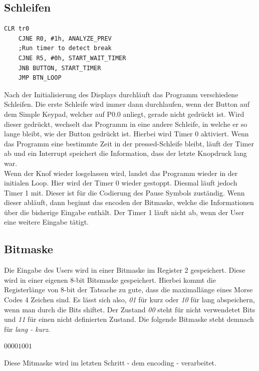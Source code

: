 \documentclass[a4paper,12pt]{article}
\begin{document}
	\subsection{Schleifen}
		\begin{lstlisting}[caption={Dauerschleife während Knopf nicht gedrückt ist},captionpos=b]
	CLR tr0
	CJNE R0, #1h, ANALYZE_PREV
	;Run timer to detect break
	CJNE R5, #0h, START_WAIT_TIMER
	JNB BUTTON, START_TIMER
	JMP BTN_LOOP
		\end{lstlisting}
	Nach der Initialisierung des Displays durchläuft das Programm verschiedene Schleifen. Die erste Schleife wird immer dann durchlaufen, wenn der Button auf dem Simple Keypad, welcher auf P0.0 anliegt, gerade nicht gedrückt ist. Wird dieser gedrückt, wechselt das Programm in eine andere Schleife, in welche er so lange bleibt, wie der Button gedrückt ist. Hierbei wird Timer 0 aktiviert. Wenn das Programm eine bestimmte Zeit in der pressed-Schleife bleibt, läuft der Timer ab und ein Interrupt speichert die Information, dass der letzte Knopdruck lang war.\\
	Wenn der Knof wieder losgelassen wird, landet das Programm wieder in der initialen Loop. Hier wird der Timer 0 wieder gestoppt. Diesmal läuft jedoch Timer 1 mit. Dieser ist für die Codierung des Pause Symbols zuständig. Wenn dieser abläuft, dann beginnt das encoden der Bitmaske, welche die Informationen über die bisherige Eingabe enthält. Der Timer 1 läuft nicht ab, wenn der User eine weitere Eingabe tätigt.
	
	\subsection{Bitmaske}
	 Die Eingabe des Users wird in einer Bitmaske im Register 2 gespeichert. Diese wird in einer eigenen 8-bit Bitsmaske gespeichert. Hierbei kommt die Registerlänge von 8-bit der Tatsache zu gute, dass die maximallänge eines Morse Codes 4 Zeichen sind. Es lässt sich also, \textit{01} für kurz oder \textit{10} für lang abspeichern, wenn man durch die Bits shiftet. Der Zustand \textit{00} steht für nicht verwendetet Bits und \textit{11} für einen nicht definierten Zustand. Die folgende Bitmaske steht demnach für \textit{lang - kurz}.
	 \begin{center}
		$00001001$
	\end{center}
	Diese Mitmaske wird im letzten Schritt - dem encoding - verarbeitet.
	 
\end{document}
